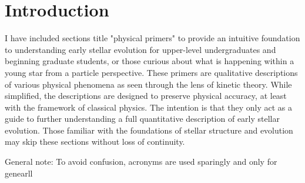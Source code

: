 \section{Introduction}
I have included sections title "physical primers" to provide an intuitive foundation to understanding early stellar evolution for upper-level undergraduates and beginning graduate students, or those curious about what is happening within a young star from a particle perspective. These primers are qualitative descriptions of various physical phenomena as seen through the lens of kinetic theory. While simplified, the descriptions are designed to preserve physical accuracy, at least with the framework of classical physics. The intention is that they only act as a guide to further understanding a full quantitative description of early stellar evolution. Those familiar with the foundations of stellar structure and evolution may skip these sections without loss of continuity.

General note: To avoid confusion, acronyms are used sparingly and only for genearll 